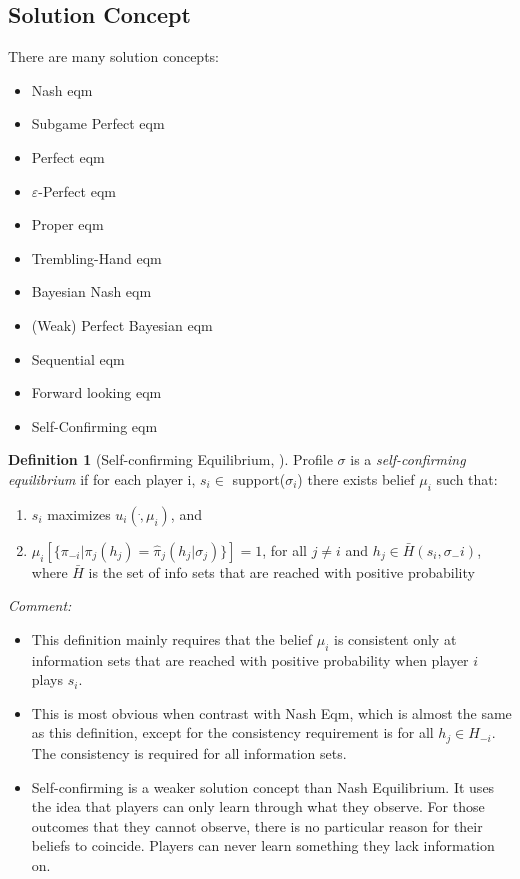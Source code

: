 \documentclass{book}
\theoremstyle{plain}
\theoremstyle{definition}
\newtheorem{defn}{Definition}[section] %
\begin{document}
\subsection{Solution Concept} %
\label{sec:solution_concept}

There are many solution concepts:
\begin{itemize}
	\item Nash eqm
	\item Subgame Perfect eqm
	\item Perfect eqm
	\item $\varepsilon$-Perfect eqm
	\item Proper eqm
	\item Trembling-Hand eqm
	\item Bayesian Nash eqm
	\item (Weak) Perfect Bayesian eqm
	\item Sequential eqm
	\item Forward looking eqm
	\item Self-Confirming eqm

\end{itemize}


\begin{defn}[Self-confirming Equilibrium, \cite{Fudenberg_Levine:93EMCAa}]
Profile $\sigma$ is a \textit{self-confirming equilibrium} if for each player i, $s_i \in$ support($\sigma_i$) there exists belief $\mu_i$ such that:
\begin{enumerate}
	\item $s_i$ maximizes $u_i(\dot,\mu_i)$, and
	\item $\mu_i[\{\pi_{-i}|\pi_j(h_j)=
	\hat \pi_j(h_j|\sigma_j)\}]=1$, for all $j \neq i$ and $h_j \in \bar H(s_i,\sigma_-i)$, where $\bar H$ is the set of info sets that are reached with positive probability
\end{enumerate}
\end{defn}

\begin{singlespacing}
\noindent
\textit{Comment:}
\end{singlespacing}
\begin{itemize}
	\setlength{\itemsep}{0pt}
	\item This definition mainly requires that the belief $\mu_i$ is consistent only at information sets that are reached with positive probability when player $i$ plays $s_i$.
	\item This is most obvious when contrast with Nash Eqm, which is almost the same as this definition,
	except for the consistency requirement is for all $h_j \in H_{-i}$. The consistency is required  for all information sets.
	\item Self-confirming is a weaker solution concept than Nash Equilibrium. 
	It uses the idea that players can only learn through what they observe.
	For those outcomes that they cannot observe,
	there is no particular reason for their beliefs to coincide.
	Players can never learn something they lack information on.
\end{itemize}
\end{document}
